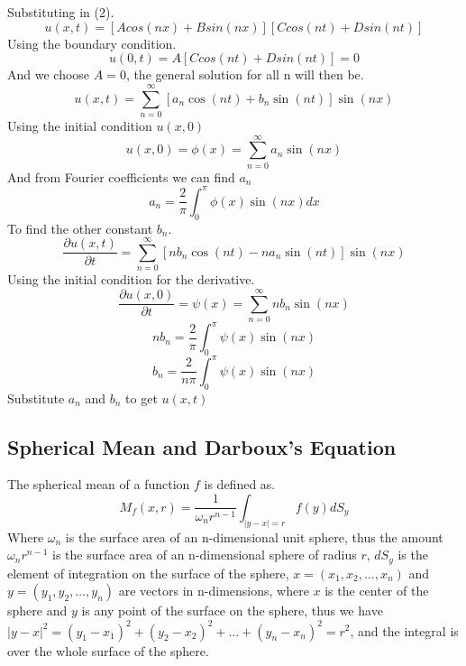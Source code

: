 \documentclass[]{article}
\begin{document}
Substituting in (2).
\[
    u\left(x,t\right) = \left[Acos\left(nx\right)+Bsin\left(nx\right)\right]\left[Ccos\left(nt\right)+Dsin\left(nt\right)\right]    
\]
Using the boundary condition.
\[
    u\left(0,t\right) = A\left[Ccos\left(nt\right)+Dsin\left(nt\right)\right]=0    
\]
And we choose $A=0$, the general solution for all n will then be.
\[
    u\left(x,t\right) = \sum_{n=0}^{\infty}\left[a_{n}\cos\left(nt\right)+b_{n}\sin\left(nt\right)\right]\sin\left(nx\right)    
\]
Using the initial condition $u(x,0)$
\[
    u\left(x,0\right) = \phi\left(x\right) = \sum_{n=0}^{\infty}a_{n}\sin\left(nx\right)    
\]
And from Fourier coefficients we can find $a_n$
\[
    a_n = \frac{2}{\pi}\int_{0}^{\pi}\phi\left(x\right)\sin\left(nx\right)dx    
\]
To find the other constant $b_{n}$.
\[
    \frac{\partial u\left(x,t\right)}{\partial t} = \sum_{n=0}^{\infty}\left[nb_{n}\cos\left(nt\right)-na_{n}\sin\left(nt\right)\right]\sin\left(nx\right)    
\]
Using the initial condition for the derivative.
\[
    \frac{\partial u\left(x,0\right)}{\partial t} = \psi\left(x\right)= \sum_{n=0}^{\infty}nb_{n}\sin\left(nx\right)    
\]
\[
    nb_n = \frac{2}{\pi} \int_{0}^{\pi}\psi\left(x\right)\sin\left(nx\right)    
\]
\[
    b_n = \frac{2}{n\pi} \int_{0}^{\pi}\psi\left(x\right)\sin\left(nx\right)    
\]
Substitute $a_n$ and $b_n$ to get $u\left(x,t\right)$

\setcounter{equation}{0}
\subsection{Spherical Mean and Darboux's Equation}
The spherical mean of a function $f$ is defined as.
\begin{equation}
M_{f}(x,r) = \frac{1}{\omega_{n}r^{n-1}} \int_{|y-x|=r} f(y)dS_y
\end{equation}
Where $\omega_{n}$ is the surface area of an n-dimensional unit sphere, thus the amount $\omega_{n}r^{n-1}$ is the surface area of an n-dimensional sphere of radius $r$, $dS_y$ is the element of integration on the surface of the sphere, $x = (x_{1},x_{2}, \dots,x_{n})$ and $y = (y_{1},y_{2}, \dots,y_{n})$ are vectors in n-dimensions, where $x$ is the center of the sphere and $y$ is any point of the surface on the sphere, thus we have $|y-x|^2 = {(y_{1}-x_{1})}^2 + {(y_{2}-x_{2})}^2 + \dots + {(y_{n}-x_{n})}^2 = r^2$, and the integral is over the whole surface of the sphere.
\end{document}
